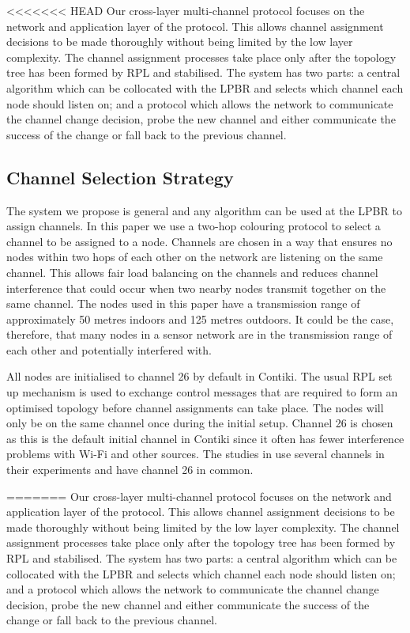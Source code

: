 <<<<<<< HEAD
Our cross-layer multi-channel protocol focuses on the network and application layer of the protocol. This allows channel assignment decisions to be made thoroughly without being limited by the low layer complexity. The channel assignment processes take place only after the topology tree has been formed by RPL and stabilised. The system has two parts: a central algorithm which can be collocated with the LPBR and selects which channel each node should listen on; and a protocol which allows the network to communicate the channel change decision, probe the new channel and either communicate the success of the change or fall back to the previous channel. 

\subsection{Channel Selection Strategy}

The system we propose is general and any algorithm can be used at the LPBR to assign channels. In this paper we use a two-hop colouring protocol to select a channel to be assigned to a node. Channels are chosen in a way that ensures no nodes within two hops of each other on the network are listening on the same channel.
This allows fair load balancing on the channels and reduces channel interference that could occur when two nearby nodes transmit together on the same channel. The nodes used in this paper have a transmission range of approximately 50 metres indoors and 125 metres outdoors. It could be the case, therefore, that many nodes in a sensor network are in the transmission range of each other and potentially interfered with.

All nodes are initialised to channel 26 by default in Contiki.
The usual RPL set up mechanism is used to exchange control messages that are required to form an optimised topology before channel assignments can take place. The nodes will only be on the same channel once during the initial setup. Channel 26 is chosen as this is the default initial channel in Contiki since it often has fewer interference problems with Wi-Fi and other sources. The studies in \cite{chrysso, micmac, watteyne} use several channels in their experiments and have channel 26 in common.
	
=======
Our cross-layer multi-channel protocol focuses on the network and application layer of the protocol. This allows channel assignment decisions to be made thoroughly without being limited by the low layer complexity. The channel assignment processes take place only after the topology tree has been formed by RPL and stabilised. The system
has two parts: a central algorithm which can be collocated with the LPBR and selects which channel each node should listen on; and a protocol which allows the network to communicate the channel change decision, probe the new channel and either communicate the success of the change or fall back to the previous channel. 

